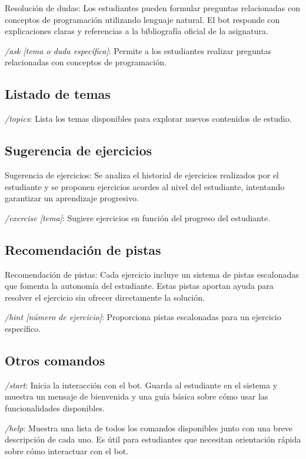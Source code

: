 \documentclass{article}
\begin{document}
Resolución de dudas: Los estudiantes pueden formular preguntas relacionadas con conceptos de programación utilizando lenguaje natural. El bot responde con explicaciones claras y referencias a la bibliografía oficial de la asignatura.

\textit{/ask [tema o duda específica]}:  
    Permite a los estudiantes realizar preguntas relacionadas con conceptos de programación.
    
\subsection{Listado de temas}

\textit{/topics}:  
    Lista los temas disponibles para explorar nuevos contenidos de estudio.

\subsection{Sugerencia de ejercicios}
Sugerencia de ejercicios: Se analiza el historial de ejercicios realizados por el estudiante y se proponen ejercicios acordes al nivel del estudiante, intentando garantizar un aprendizaje progresivo.

\textit{/exercise [tema]}:  
    Sugiere ejercicios en función del progreso del estudiante.

\subsection{Recomendación de pistas}

Recomendación de pistas: Cada ejercicio incluye un sistema de pistas escalonadas que fomenta la autonomía del estudiante. Estas pistas aportan ayuda para resolver el ejercicio sin ofrecer directamente la solución.

\textit{/hint [número de ejercicio]}:  
    Proporciona pistas escalonadas para un ejercicio específico.

\subsection{Otros comandos}
\textit{/start}:  
    Inicia la interacción con el bot. Guarda al estudiante en el sistema y muestra un mensaje de bienvenida y una guía básica sobre cómo usar las funcionalidades disponibles.
    
\textit{/help}:  
    Muestra una lista de todos los comandos disponibles junto con una breve descripción de cada uno. Es útil para estudiantes que necesitan orientación rápida sobre cómo interactuar con el bot.  
\end{document}
